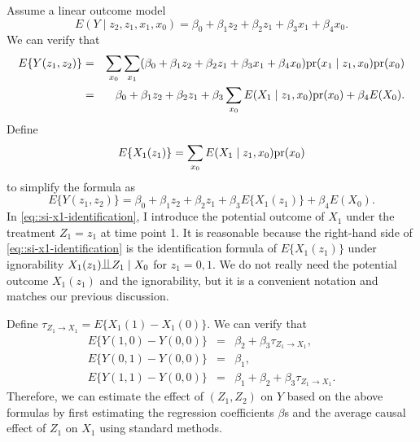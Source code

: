 \begin{example}\label{example::linear-si}
Assume a linear outcome model
$$
E(Y\mid z_2,z_1,x_1, x_0) = \beta_0+ \beta_1 z_2 + \beta_2 z_1   + \beta_3  x_1  +\beta_4 x_0.
$$
We can verify that
\begin{eqnarray*}
E\{ Y(z_1, z_2) \}  &=& \sum_{x_0} \sum_{x_1} (\beta_0+ \beta_1 z_2 + \beta_2 z_1 + \beta_3 x_1  +\beta_4 x_0) \textup{pr}(x_1\mid   z_1, x_0) \textup{pr}(x_0)  \\
&=& \beta_0 + \beta_1 z_2 + \beta_2  z_1  +  \beta_3 \sum_{x_0} E(X_1\mid z_1, x_0) \textup{pr}(x_0)  +\beta_4 E(X_0) .
\end{eqnarray*}
Define 
\begin{equation}\label{eq::si-x1-identification}
E\{ X_1(z_1)\} = \sum_{x_0} E(X_1\mid z_1, x_0) \pr(x_0) 
\end{equation}
to simplify the formula as
$$
E\{ Y(z_1, z_2) \}  = \beta_0 + \beta_1 z_2 + \beta_2 z_1  + \beta_3 E\{ X_1(z_1)\}   +\beta_4 E(X_0) .
$$
In \eqref{eq::si-x1-identification}, I introduce the potential outcome of $X_1$ under the treatment $Z_1=z_1$ at time point 1. It is reasonable because the right-hand side of \eqref{eq::si-x1-identification} is the identification formula of $E\{ X_1(z_1)\} $ under  ignorability $X_1(z_1)\ind Z_1 \mid X_0$ for $z_1  = 0, 1$. We do not really need the potential outcome $X_1(z_1)$ and the ignorability, but it is a convenient notation and matches our previous discussion.
 
 
Define $\tau_{Z_1\rightarrow X_1} = E\{ X_1(1)  - X_1(0)\}$. We can verify that
\begin{eqnarray*}
E\{ Y(1,0)  - Y(0,0)\} &=& \beta_2 +  \beta_3 \tau_{Z_1\rightarrow X_1},\\
E\{ Y(0,1)  - Y(0,0)\} &=& \beta_1,\\
E\{ Y(1,1)  - Y(0,0)\} &=& \beta_1 +  \beta_2 + \beta_3 \tau_{Z_1\rightarrow X_1}.
\end{eqnarray*}
Therefore, we can estimate the effect of $(Z_1,Z_2)$ on $Y$ based on the above formulas by first estimating the regression coefficients $\beta$s and the average causal effect of $Z_1$ on $X_1$ using standard methods. 



\end{example}
